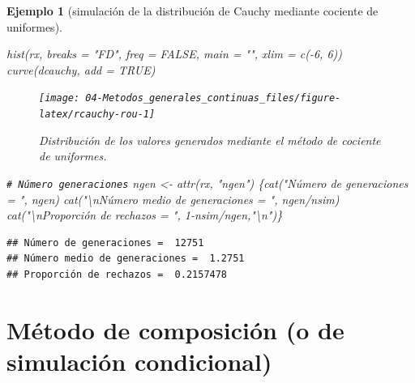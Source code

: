 \documentclass[
]{book}
\newenvironment{Shaded}{\begin{snugshade}}{\end{snugshade}}
\newcommand{\AttributeTok}[1]{\textcolor[rgb]{0.77,0.63,0.00}{#1}}
\newcommand{\CommentTok}[1]{\textcolor[rgb]{0.56,0.35,0.01}{\textit{#1}}}
\newcommand{\ConstantTok}[1]{\textcolor[rgb]{0.00,0.00,0.00}{#1}}
\newcommand{\DecValTok}[1]{\textcolor[rgb]{0.00,0.00,0.81}{#1}}
\newcommand{\FunctionTok}[1]{\textcolor[rgb]{0.00,0.00,0.00}{#1}}
\newcommand{\NormalTok}[1]{#1}
\newcommand{\OtherTok}[1]{\textcolor[rgb]{0.56,0.35,0.01}{#1}}
\newcommand{\SpecialCharTok}[1]{\textcolor[rgb]{0.00,0.00,0.00}{#1}}
\newcommand{\StringTok}[1]{\textcolor[rgb]{0.31,0.60,0.02}{#1}}
\theoremstyle{break}
\newtheorem{example}{Ejemplo}[chapter]
\theoremstyle{nonumberplain}
\renewcommand{\CommentTok}[1]{\textcolor[rgb]{0.41,0.41,0.41}{\texttt{#1}}}
\begin{document}
\begin{example}[simulación de la distribución de Cauchy mediante cociente de uniformes]
\begin{Shaded}
\begin{Highlighting}[]
\FunctionTok{hist}\NormalTok{(rx, }\AttributeTok{breaks =} \StringTok{"FD"}\NormalTok{, }\AttributeTok{freq =} \ConstantTok{FALSE}\NormalTok{, }\AttributeTok{main =} \StringTok{""}\NormalTok{, }\AttributeTok{xlim =} \FunctionTok{c}\NormalTok{(}\SpecialCharTok{{-}}\DecValTok{6}\NormalTok{, }\DecValTok{6}\NormalTok{))}
\FunctionTok{curve}\NormalTok{(dcauchy, }\AttributeTok{add =} \ConstantTok{TRUE}\NormalTok{)}
\end{Highlighting}
\end{Shaded}

\begin{figure}[!htb]

{\centering \texttt{[image: 04-Metodos\_generales\_continuas\_files/figure-latex/rcauchy-rou-1]} 

}

\caption{Distribución de los valores generados mediante el método de cociente de uniformes.}\label{fig:rcauchy-rou}
\end{figure}

\begin{Shaded}
\begin{Highlighting}[]
\CommentTok{\# Número generaciones}
\NormalTok{ngen }\OtherTok{\textless{}{-}} \FunctionTok{attr}\NormalTok{(rx, }\StringTok{"ngen"}\NormalTok{)}
\NormalTok{\{}\FunctionTok{cat}\NormalTok{(}\StringTok{"Número de generaciones = "}\NormalTok{, ngen)}
\FunctionTok{cat}\NormalTok{(}\StringTok{"}\SpecialCharTok{\textbackslash{}n}\StringTok{Número medio de generaciones = "}\NormalTok{, ngen}\SpecialCharTok{/}\NormalTok{nsim)}
\FunctionTok{cat}\NormalTok{(}\StringTok{"}\SpecialCharTok{\textbackslash{}n}\StringTok{Proporción de rechazos = "}\NormalTok{, }\DecValTok{1}\SpecialCharTok{{-}}\NormalTok{nsim}\SpecialCharTok{/}\NormalTok{ngen,}\StringTok{"}\SpecialCharTok{\textbackslash{}n}\StringTok{"}\NormalTok{)\}}
\end{Highlighting}
\end{Shaded}

\begin{verbatim}
## Número de generaciones =  12751
## Número medio de generaciones =  1.2751
## Proporción de rechazos =  0.2157478
\end{verbatim}

\end{example}

\hypertarget{composicion}{%
\section{Método de composición (o de simulación condicional)}\label{composicion}}
\end{document}
